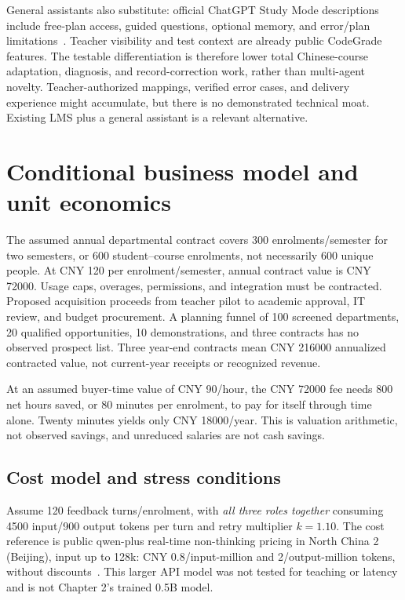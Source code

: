 General assistants also substitute: official ChatGPT Study Mode descriptions include free-plan access, guided questions, optional memory, and error/plan limitations~\cite{businessstudymode}. Teacher visibility and test context are already public CodeGrade features. The testable differentiation is therefore lower total Chinese-course adaptation, diagnosis, and record-correction work, rather than multi-agent novelty. Teacher-authorized mappings, verified error cases, and delivery experience might accumulate, but there is no demonstrated technical moat. Existing LMS plus a general assistant is a relevant alternative.

\section{Conditional business model and unit economics}
The assumed annual departmental contract covers 300 enrolments/semester for two semesters, or 600 student--course enrolments, not necessarily 600 unique people. At CNY 120 per enrolment/semester, annual contract value is CNY 72000. Usage caps, overages, permissions, and integration must be contracted. Proposed acquisition proceeds from teacher pilot to academic approval, IT review, and budget procurement. A planning funnel of 100 screened departments, 20 qualified opportunities, 10 demonstrations, and three contracts has no observed prospect list. Three year-end contracts mean CNY 216000 annualized contracted value, not current-year receipts or recognized revenue.

At an assumed buyer-time value of CNY 90/hour, the CNY 72000 fee needs 800 net hours saved, or 80 minutes per enrolment, to pay for itself through time alone. Twenty minutes yields only CNY 18000/year. This is valuation arithmetic, not observed savings, and unreduced salaries are not cash savings.

\subsection{Cost model and stress conditions}
Assume 120 feedback turns/enrolment, with \emph{all three roles together} consuming 4500 input/900 output tokens per turn and retry multiplier $k=1.10$. The cost reference is public qwen-plus real-time non-thinking pricing in North China 2 (Beijing), input up to 128k: CNY 0.8/input-million and 2/output-million tokens, without discounts~\cite{businessprice}. This larger API model was not tested for teaching or latency and is not Chapter 2's trained 0.5B model.

